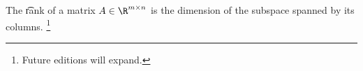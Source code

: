 

The \t{rank} of a matrix $A \in \R ^{m \times n}$ is the dimension of the subspace spanned by its columns.
  \ifhmode\unskip\fi\footnote{
Future editions will expand.
  }

\blankpage
